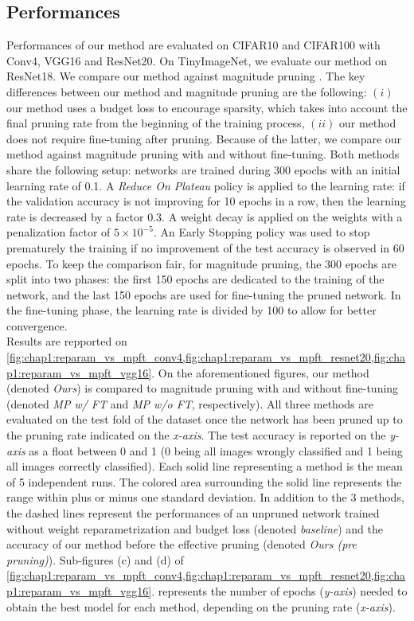 \subsection{Performances}
\label{sec:chap1:performances}
Performances of our method are evaluated on CIFAR10 and CIFAR100 with Conv4, VGG16
and ResNet20. On TinyImageNet, we evaluate our method on ResNet18. We compare
our method against magnitude pruning \cite{DBLP:conf/nips/HanPTD15}. The key
differences between our method and magnitude pruning are the following: $(i)$
our method uses a budget loss to encourage sparsity, which takes into account the
final pruning rate from the beginning of the training process, $(ii)$ our method
does not require fine-tuning after pruning. Because of the latter, we compare
our method against magnitude pruning with and without fine-tuning. Both methods
share the following setup: networks are trained during 300 epochs with an
initial learning rate of 0.1. A {\em Reduce On Plateau} policy is applied to the
learning rate: if the validation accuracy is not improving for 10 epochs in a
row, then the learning rate is decreased by a factor 0.3. A weight decay is
applied on the weights with a penalization factor of $5\times10^{−5}$. An Early
Stopping policy was used to stop prematurely the training if no improvement of
the test accuracy is observed in 60 epochs. To keep the comparison fair, for
magnitude pruning, the 300 epochs are split into two phases: the first 150 epochs
are dedicated to the training of the network, and the last 150 epochs are used
for fine-tuning the pruned network. In the fine-tuning phase, the learning rate
is divided by 100 to allow for better convergence. \\

Results are repported on
\cref{fig:chap1:reparam_vs_mpft_conv4,fig:chap1:reparam_vs_mpft_resnet20,fig:chap1:reparam_vs_mpft_vgg16}.
On the aforementioned figures, our method (denoted \emph{Ours}) is compared to
magnitude pruning with and without fine-tuning (denoted \emph{MP w/ FT} and
\emph{MP w/o FT}, respectively). All three methods are evaluated on the test
fold of the dataset once the network has been pruned up to the pruning rate
indicated on the \emph{x-axis}. The test accuracy is reported on the
\emph{y-axis} as a float between 0 and 1 (0 being all images wrongly classified
and 1 being all images correctly classified). Each solid line representing a
method is the mean of 5 independent runs. The colored area surrounding the solid
line represents the range within plus or minus one standard deviation. In
addition to the 3 methods, the dashed lines represent the performances of an
unpruned network trained without weight reparametrization and budget loss
(denoted \emph{baseline}) and the accuracy of our method before the effective
pruning (denoted \emph{Ours (pre pruning)}). Sub-figures (c) and (d) of  \cref{fig:chap1:reparam_vs_mpft_conv4,fig:chap1:reparam_vs_mpft_resnet20,fig:chap1:reparam_vs_mpft_vgg16}.
represents the number of epochs (\emph{y-axis}) needed to obtain the best model for each method,
depending on the pruning rate (\emph{x-axis}).\\


